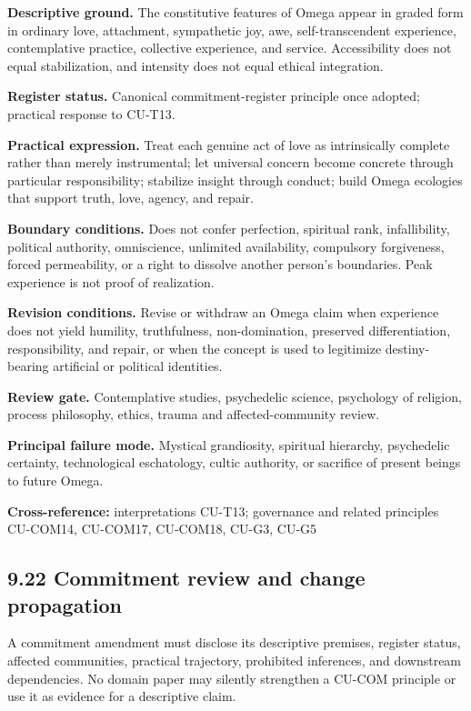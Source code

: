 \documentclass[
  11pt,
]{article}
\begin{document}
\textbf{Descriptive ground.} The constitutive features of Omega appear
in graded form in ordinary love, attachment, sympathetic joy, awe,
self-transcendent experience, contemplative practice, collective
experience, and service. Accessibility does not equal stabilization, and
intensity does not equal ethical integration.

\textbf{Register status.} Canonical commitment-register principle once
adopted; practical response to CU-T13.

\textbf{Practical expression.} Treat each genuine act of love as
intrinsically complete rather than merely instrumental; let universal
concern become concrete through particular responsibility; stabilize
insight through conduct; build Omega ecologies that support truth, love,
agency, and repair.

\textbf{Boundary conditions.} Does not confer perfection, spiritual
rank, infallibility, political authority, omniscience, unlimited
availability, compulsory forgiveness, forced permeability, or a right to
dissolve another person's boundaries. Peak experience is not proof of
realization.

\textbf{Revision conditions.} Revise or withdraw an Omega claim when
experience does not yield humility, truthfulness, non-domination,
preserved differentiation, responsibility, and repair, or when the
concept is used to legitimize destiny-bearing artificial or political
identities.

\textbf{Review gate.} Contemplative studies, psychedelic science,
psychology of religion, process philosophy, ethics, trauma and
affected-community review.

\textbf{Principal failure mode.} Mystical grandiosity, spiritual
hierarchy, psychedelic certainty, technological eschatology, cultic
authority, or sacrifice of present beings to future Omega.

\textbf{Cross-reference:} interpretations CU-T13; governance and related
principles CU-COM14, CU-COM17, CU-COM18, CU-G3, CU-G5

\subsection{9.22 Commitment review and change
propagation}\label{commitment-review-and-change-propagation}

A commitment amendment must disclose its descriptive premises, register
status, affected communities, practical trajectory, prohibited
inferences, and downstream dependencies. No domain paper may silently
strengthen a CU-COM principle or use it as evidence for a descriptive
claim.
\end{document}
